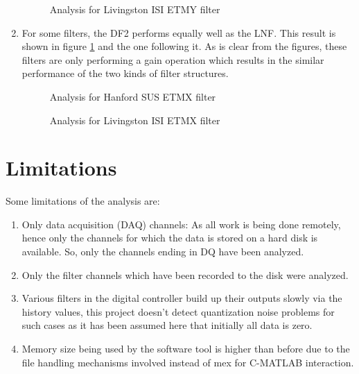 \documentclass[colorlinks=true,pdfstartview=FitV,linkcolor=blue,
            citecolor=red,urlcolor=magenta]{ligodoc}
\begin{document}
\begin{enumerate}
\begin{figure}[H]
			  \centering
			  \def\svgscale{0.5}
			  \tiny{
			  
			  }
			  \caption{Analysis for Livingston ISI ETMY filter}
		\end{figure}
		
		\item For some filters, the DF2 performs equally well as the LNF. This result is shown in figure \ref{bqfdf} and the one following it. As is clear from the figures, these filters are only performing a gain operation which results in the similar performance of the two kinds of filter structures.
		\begin{figure}[H]
 
			  \centering
			  \def\svgscale{0.5}
			  \tiny{
			  
			  }
			  \caption{Analysis for Hanford SUS ETMX filter}
			 \label{bqfdf}
		\end{figure}
		\begin{figure}[H]
 
			  \centering
			  \def\svgscale{0.5}
			  \tiny{
			  
			  }
			  \caption{Analysis for Livingston ISI ETMX filter}
		\end{figure}
	\end{enumerate}
	\section{Limitations}
	\label{limitations}
	Some limitations of the analysis are:
		\begin{enumerate}
			\item Only data acquisition (DAQ) channels: As all work is being done remotely, hence only the channels for which the data is stored on a hard disk is available. So, only the channels ending in \textunderscore DQ have been analyzed.
			\item Only the filter channels which have been recorded to the disk were analyzed.
			\item Various filters in the digital controller build up their outputs slowly via the history values, this project doesn't detect quantization noise problems for such cases as it has been assumed here that initially all data is zero.
			\item Memory size being used by the software tool is higher than before due to the file handling mechanisms involved instead of mex for C-MATLAB interaction.
		\end{enumerate}	
\end{document}
